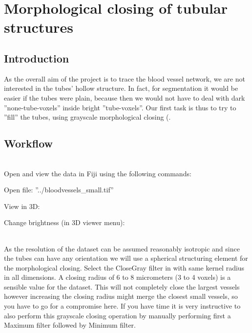 \section{Morphological closing of tubular structures}

\subsection{Introduction}
As the overall aim of the project is to trace the blood vessel network, we are not interested in the tubes' hollow structure. In fact, for segmentation it would be easier if the tubes were plain, because then we would not have to deal with dark ''none-tube-voxels'' inside bright ''tube-voxels''. Our first task is thus to try to ''fill'' the tubes, using grayscale morphological closing (\cite{vincent1993morphological}.

\subsection{Workflow}

\begin{description}
\item[Data examination] \hfill \\ 
Open and view the data in Fiji using the following commands:

\item Open file:   ''../bloodvessels\_small.tif''
\item View in 3D: 
\item Change brightness (in 3D viewer menu): 
\item[Perform 3D morphological closing] \hfill \\ 
As the resolution of the dataset can be assumed reasonably isotropic and since the tubes can have any orientation we will use a spherical structuring element for the morphological closing. Select the CloseGray filter in  with same kernel radius in all dimensions. A closing radius of 6 to 8 micrometers (3 to 4 voxels) is a sensible value for the dataset. This will not completely close the largest vessels however increasing the closing radius might merge the closest small vessels, so you have to go for a compromise here.  If you have time it is very instructive to also perform this grayscale closing operation by manually performing first a Maximum filter followed by Minimum filter.
\end{description}


